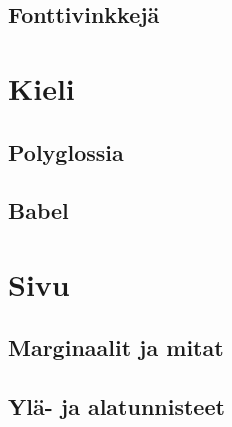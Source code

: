 \subsection{Fonttivinkkejä}

\section{Kieli}
\label{luku:kieliasetukset}

\subsection{Polyglossia}
\subsection{Babel}

\section{Sivu}
\label{luku:sivuasetukset}
\subsection{Marginaalit ja mitat}
\subsection{Ylä- ja alatunnisteet}

